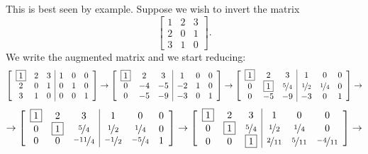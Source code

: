 This is best seen by example.  Suppose we wish to invert the matrix
\begin{equation*}
\begin{bmatrix}
1 & 2 & 3 \\
2 & 0 & 1 \\
3 & 1 & 0
\end{bmatrix} .
\end{equation*}
We write the augmented matrix and we start reducing:
\begin{equation*}
\left[
\begin{array}{ccc|ccc}
\boxed{1} & 2 & 3 & 1 & 0 & 0\\
2 & 0 & 1 & 0 & 1 & 0 \\
3 & 1 & 0 & 0 & 0 & 1
\end{array}
\right]
\to
\left[
\begin{array}{ccc|ccc}
\boxed{1} & 2 & 3 & 1 & 0 & 0\\
0 & -4 & -5 & -2 & 1 & 0 \\
0 & -5 & -9 & -3 & 0 & 1
\end{array}
\right]
\to
\left[
\begin{array}{ccc|ccc}
\boxed{1} & 2 & 3 & 1 & 0 & 0\\
0 & \boxed{1} & \nicefrac{5}{4} & \nicefrac{1}{2} & \nicefrac{1}{4} & 0 \\
0 & -5 & -9 & -3 & 0 & 1
\end{array}
\right]
\to
\end{equation*}
\begin{equation*}
\to
\left[
\begin{array}{ccc|ccc}
\boxed{1} & 2 & 3 & 1 & 0 & 0\\
0 & \boxed{1} & \nicefrac{5}{4} & \nicefrac{1}{2} & \nicefrac{1}{4} & 0 \\
0 & 0 & \nicefrac{-11}{4} & \nicefrac{-1}{2} & \nicefrac{-5}{4} & 1
\end{array}
\right]
\to
\left[
\begin{array}{ccc|ccc}
\boxed{1} & 2 & 3 & 1 & 0 & 0\\
0 & \boxed{1} & \nicefrac{5}{4} & \nicefrac{1}{2} & \nicefrac{1}{4} & 0 \\
0 & 0 & \boxed{1} & \nicefrac{2}{11} & \nicefrac{5}{11} & \nicefrac{-4}{11}
\end{array}
\right]
\to
\end{equation*}
